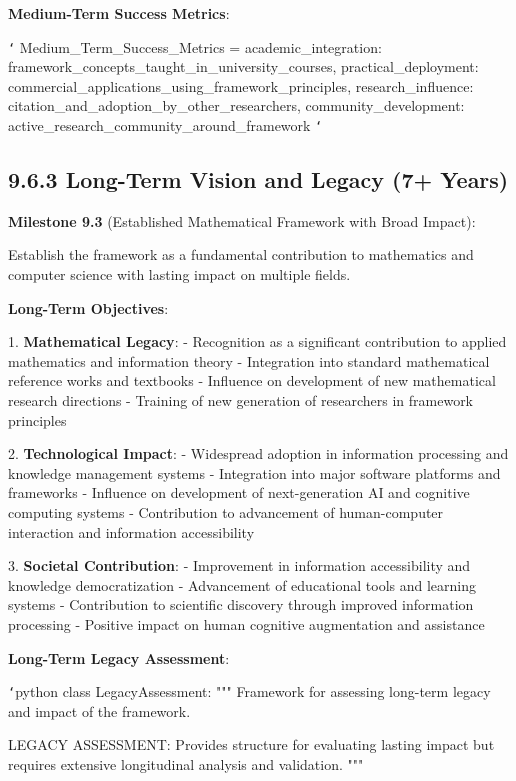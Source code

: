 \textbf{Medium-Term Success Metrics}:

\texttt{`}
Medium_Term_Success_Metrics = {
    academic_integration: framework_concepts_taught_in_university_courses,
    practical_deployment: commercial_applications_using_framework_principles,
    research_influence: citation_and_adoption_by_other_researchers,
    community_development: active_research_community_around_framework
}
\texttt{`}

\subsection{9.6.3 Long-Term Vision and Legacy (7+ Years)}

\textbf{Milestone 9.3} (Established Mathematical Framework with Broad Impact):

Establish the framework as a fundamental contribution to mathematics and computer science with lasting impact on multiple fields.

\textbf{Long-Term Objectives}:

1. \textbf{Mathematical Legacy}:
   - Recognition as a significant contribution to applied mathematics and information theory
   - Integration into standard mathematical reference works and textbooks
   - Influence on development of new mathematical research directions
   - Training of new generation of researchers in framework principles

2. \textbf{Technological Impact}:
   - Widespread adoption in information processing and knowledge management systems
   - Integration into major software platforms and frameworks
   - Influence on development of next-generation AI and cognitive computing systems
   - Contribution to advancement of human-computer interaction and information accessibility

3. \textbf{Societal Contribution}:
   - Improvement in information accessibility and knowledge democratization
   - Advancement of educational tools and learning systems
   - Contribution to scientific discovery through improved information processing
   - Positive impact on human cognitive augmentation and assistance

\textbf{Long-Term Legacy Assessment}:

\texttt{`}python
class LegacyAssessment:
    """
    Framework for assessing long-term legacy and impact of the framework.
    
    LEGACY ASSESSMENT: Provides structure for evaluating lasting impact
    but requires extensive longitudinal analysis and validation.
    """
    
